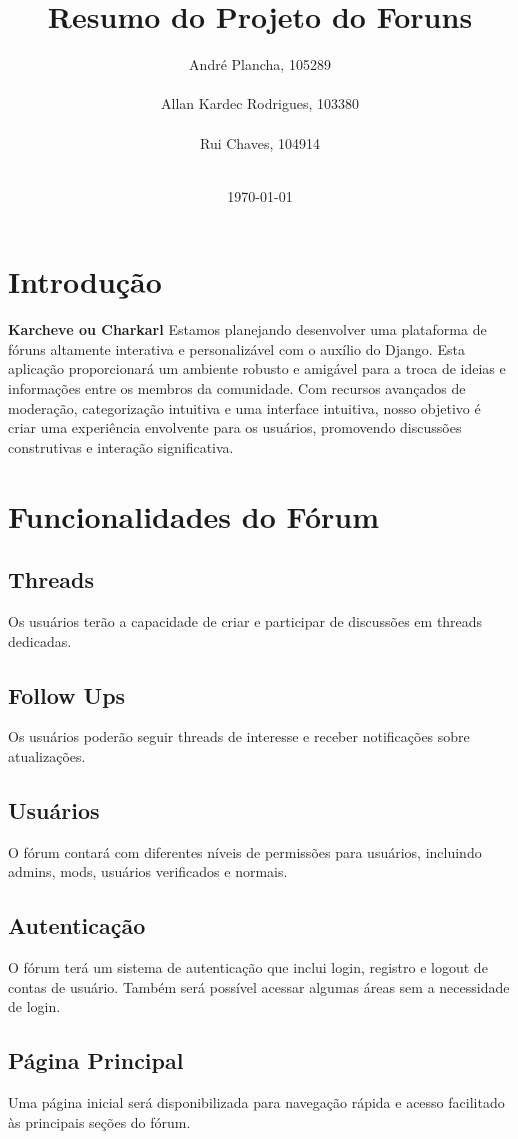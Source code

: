 \documentclass{article}
\title{Resumo do Projeto do Foruns}
\author{
  André Plancha, 105289 \\
  \email{Andre\_Plancha@iscte-iul.pt}\\
  Allan Kardec Rodrigues, 103380 \\
  \email{aksrs@iscte-iul.pt} \\
  Rui Chaves, 104914 \\
  \email{rfpcs1@iscte.pt}\\
  \vspace{30pt}
}
\date{\today}
\begin{document}
  \thispagestyle{empty}
  \maketitle
  \pagebreak
  \section{Introdução}
  \textbf{Karcheve ou Charkarl} Estamos planejando desenvolver uma plataforma de fóruns altamente interativa e personalizável com o auxílio do Django. Esta aplicação proporcionará um ambiente robusto e amigável para a troca de ideias e informações entre os membros da comunidade. Com recursos avançados de moderação, categorização intuitiva e uma interface intuitiva, nosso objetivo é criar uma experiência envolvente para os usuários, promovendo discussões construtivas e interação significativa.
  \pagebreak
  \section{Funcionalidades do Fórum}
  
  \subsection{Threads}
  Os usuários terão a capacidade de criar e participar de discussões em threads dedicadas.
  
  \subsection{Follow Ups}
  Os usuários poderão seguir threads de interesse e receber notificações sobre atualizações.
  
  \subsection{Usuários}
  O fórum contará com diferentes níveis de permissões para usuários, incluindo admins, mods, usuários verificados e normais.
  
  \subsection{Autenticação}
  O fórum terá um sistema de autenticação que inclui login, registro e logout de contas de usuário. Também será possível acessar algumas áreas sem a necessidade de login.
  
  \subsection{Página Principal}
  Uma página inicial será disponibilizada para navegação rápida e acesso facilitado às principais seções do fórum.
  
\end{document}
